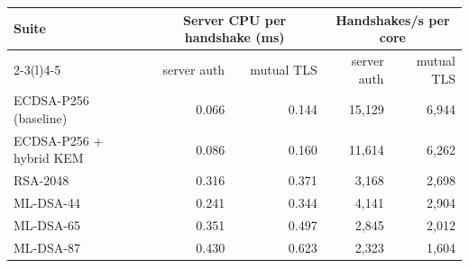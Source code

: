 \begin{tabular}{@{}lrrrr@{}}
\toprule
Suite & \multicolumn{2}{c}{Server CPU per handshake (ms)} & \multicolumn{2}{c}{Handshakes/s per core} \\
\cmidrule(lr){2-3}\cmidrule(l){4-5}
 & server auth & mutual TLS & server auth & mutual TLS \\
\midrule
ECDSA-P256 (baseline) & 0.066 & 0.144 & 15{,}129 & 6{,}944 \\
ECDSA-P256 + hybrid KEM & 0.086 & 0.160 & 11{,}614 & 6{,}262 \\
RSA-2048 & 0.316 & 0.371 & 3{,}168 & 2{,}698 \\
ML-DSA-44 & 0.241 & 0.344 & 4{,}141 & 2{,}904 \\
ML-DSA-65 & 0.351 & 0.497 & 2{,}845 & 2{,}012 \\
ML-DSA-87 & 0.430 & 0.623 & 2{,}323 & 1{,}604 \\
\bottomrule
\end{tabular}
